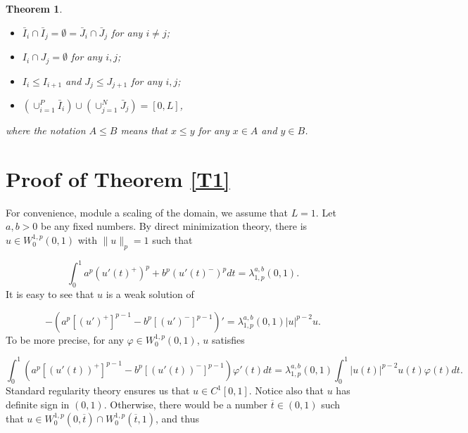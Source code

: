 \documentclass[a4paper,11pt]{article}
\newtheorem{teor}{Theorem}[section]
\begin{document}
{\begin{teor}
\begin{itemize}
\begin{itemize}
\item[(a)] $\bar{I}_i \cap \bar{I}_j = \emptyset = \bar{J}_i \cap \bar{J}_j$ for any $i \neq j$;
\item[(b)] $I_i \cap J_j = \emptyset$ for any $i, j$;
\item[(c)] $I_i \leq I_{i + 1}$ and $J_j \leq J_{j + 1}$ for any $i, j$;
\item[(d)] $\left( \cup^P_{i = 1} \bar{I}_i \right) \cup \left( \cup^N_{j = 1} \bar{J}_j \right) = [0, L]$,
\end{itemize}
where the notation $A \leq B$ means that $x \leq y$ for any $x \in A$ and $y \in B$.
\end{itemize}
\end{teor}

\section{Proof of Theorem \ref{T1}}

For convenience, module a scaling of the domain, we assume that $L = 1$. Let $a,b > 0$ be any fixed numbers. By direct minimization theory, there is $u \in W^{1,p}_{0}(0,1)$ with $\lVert u \rVert_{p} = 1$ such that

\[
\int_{0}^{1} a^p \left( u'(t)^+ \right)^p + b^p \left( u'(t)^- \right)^p dt = \lambda_{1,p}^{a,b}(0,1).
\]
It is easy to see that $u$ is a weak solution of

\begin{equation}\label{pde}
-\left(a^{p}[(u')^{+}]^{p-1}-b^{p}[(u')^{-}]^{p-1}\right)' = \lambda_{1,p}^{a,b}(0,1)|u|^{p-2}u.
\end{equation}
To be more precise, for any $\varphi \in W^{1,p}_{0}(0,1)$, $u$ satisfies

\[
\int_{0}^{1}\left(a^{p}[(u'(t))^{+}]^{p-1}-b^{p}[(u'(t))^{-}]^{p-1}\right)\varphi'(t) dt =  \lambda_{1,p}^{a,b}(0,1)\int_{0}^{1}|u(t)|^{p-2}u(t)\varphi(t) dt.
\]
Standard regularity theory ensures us that $u \in C^1[0,1]$. Notice also that $u$ has definite sign in $(0,1)$. Otherwise, there would be a number $\overline{t} \in (0,1)$ such that $u \in W^{1,p}_{0}(0,\overline{t})\cap W^{1,p}_{0}(\overline{t},1)$, and thus

}
\end{document}
